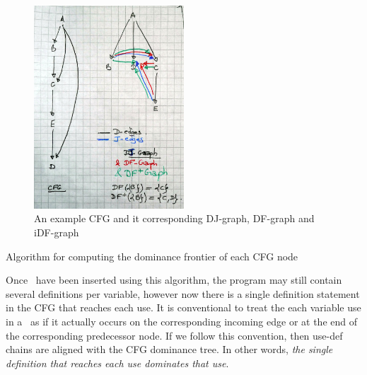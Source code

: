 \begin{figure}
\includegraphics[width=0.5\textwidth]{iDF.jpeg}
\caption{An example CFG and it corresponding DJ-graph, DF-graph and iDF-graph}
\end{figure}

\begin{algorithm}
\caption{\label{alg:classical_construction:df}Algorithm for computing the dominance frontier of each CFG node}
\end{algorithm}



Once \phiops\ have been inserted using this algorithm, the program may
still contain several definitions per variable, however now there is a
single definition statement 
in the CFG that reaches each use. 
It is conventional to treat the each variable use in a \phiop\
as if it actually occurs on the corresponding incoming edge or at the end of the
corresponding predecessor node.
If we follow this convention,  
then use-def chains are aligned with the CFG dominance tree.
In other words,
\emph{the single definition that reaches each use dominates that use}.

